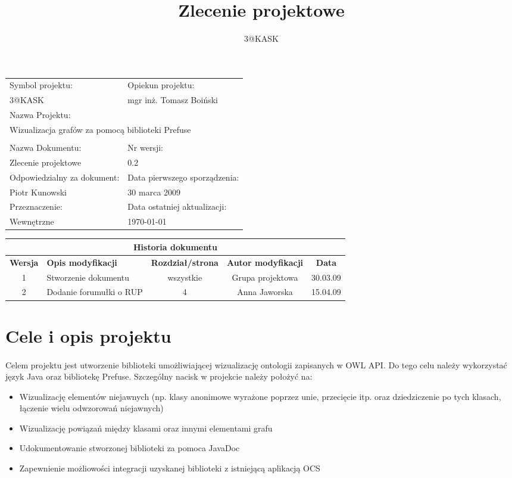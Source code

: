 \documentclass[a4paper,10pt]{article}
\title{Zlecenie projektowe }
\author{3@KASK}
\begin{document}



\maketitle

\begin{center}
\begin{tabular}{|p{7cm}|p{7cm}|}
\hline
Symbol projektu: & Opiekun projektu:   \tabularnewline
3@KASK & mgr inż. Tomasz Boiński    \tabularnewline \hline
\multicolumn{2}{|l|}{Nazwa Projektu: } \tabularnewline
\multicolumn{2}{|l|}{Wizualizacja grafów za pomocą biblioteki Prefuse} \tabularnewline
\hline
\multicolumn{2}{l}{ } \tabularnewline %
\hline
Nazwa Dokumentu: & Nr wersji:   \tabularnewline
Zlecenie projektowe & 0.2 \tabularnewline \hline
Odpowiedzialny za dokument: & Data pierwszego sporządzenia:   \tabularnewline
Piotr Kunowski & 30 marca 2009 \tabularnewline \hline
Przeznaczenie: & Data ostatniej aktualizacji:   \tabularnewline
Wewnętrzne & \today \tabularnewline \hline
\end{tabular}
\end{center}

\begin{center}
\begin{tabular}{|c|p{4cm}|c|c|c|}
\multicolumn{5}{c}{\textbf{Historia dokumentu}} \tabularnewline \hline
\textbf{Wersja} & \textbf{Opis modyfikacji} & \textbf{Rozdział/strona} & \textbf{Autor modyfikacji} & \textbf{Data} \tabularnewline \hline
1 & Stworzenie dokumentu & wszystkie & Grupa projektowa & 30.03.09 \tabularnewline \hline
2 & Dodanie forumułki o RUP   & 4   & Anna Jaworska & 15.04.09\tabularnewline \hline
\end{tabular}


\end{center}

\newpage
\tableofcontents
\newpage

\section{Cele i opis projektu}
\paragraph{} Celem projektu jest utworzenie biblioteki umożliwiającej wizualizację ontologii zapisanych w OWL API. Do tego celu należy wykorzystać język Java oraz bibliotekę Prefuse. Szczególny nacisk w projekcie należy położyć na:
\begin{itemize}
 \item Wizualizację elementów niejawnych (np. klasy anonimowe wyrażone
poprzez unie, przecięcie itp. oraz dziedziczenie po tych klasach,
łączenie wielu odwzorowań niejawnych)
\item  Wizualizację powiązań między klasami oraz innymi elementami grafu
\item  Udokumentowanie stworzonej biblioteki za pomoca JavaDoc
\item  Zapewnienie możliowości integracji uzyskanej biblioteki z istniejącą aplikacją OCS
\end{itemize}
\end{document}
